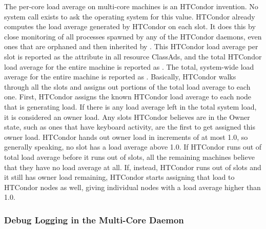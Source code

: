The per-core load average on multi-core machines is an HTCondor invention. 
No system call exists to ask the operating system for this value.
HTCondor already computes the load average generated by HTCondor on each
slot.
It does this by close monitoring of all processes spawned by any of the
HTCondor daemons, even ones that are orphaned and then inherited by
. 
This HTCondor load average per slot is reported as
the attribute
 in all resource ClassAds, and the total HTCondor
load average for the entire machine is reported as
. 
The total, system-wide load average for the entire
machine  is reported as .
Basically, HTCondor walks through all the slots and assigns out
portions of the total load average to each one. 
First, HTCondor assigns the known HTCondor load average to each node that
is generating load.  
If there is any load average left in the total system load, 
it is considered an owner load.
Any slots HTCondor believes are in the Owner state,
such as ones that have keyboard activity,
are the first to get assigned this owner load.
HTCondor hands out owner load in increments of at most 1.0, so generally
speaking, no slot has a load average above 1.0.
If HTCondor runs out of total load average before it runs out of slots,
all the remaining machines believe that they have no load average at all.
If, instead, HTCondor runs out of slots and it still has owner
load remaining, HTCondor starts assigning that load to HTCondor nodes as
well,
giving individual nodes with a load average higher than 1.0.


\subsubsection{\label{sec:SMP-logging}
Debug Logging in the Multi-Core  Daemon}

